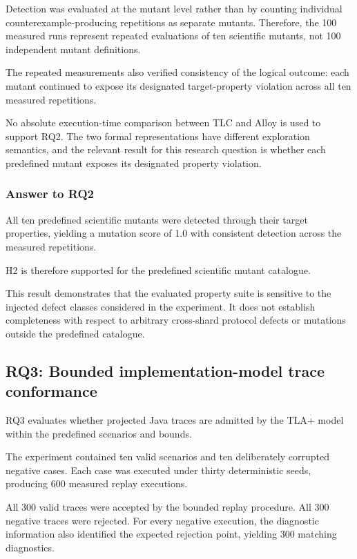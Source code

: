 Detection was evaluated at the mutant level rather than by counting
individual counterexample-producing repetitions as separate mutants.
Therefore, the 100 measured runs represent repeated evaluations of ten
scientific mutants, not 100 independent mutant definitions.

The repeated measurements also verified consistency of the logical
outcome: each mutant continued to expose its designated target-property
violation across all ten measured repetitions.

No absolute execution-time comparison between TLC and Alloy is used to
support RQ2. The two formal representations have different exploration
semantics, and the relevant result for this research question is
whether each predefined mutant exposes its designated property
violation.

\subsubsection{Answer to RQ2}
\label{subsubsec:rq2-answer}

All ten predefined scientific mutants were detected through their
target properties, yielding a mutation score of 1.0 with consistent
detection across the measured repetitions.

H2 is therefore supported for the predefined scientific mutant
catalogue.

This result demonstrates that the evaluated property suite is
sensitive to the injected defect classes considered in the experiment.
It does not establish completeness with respect to arbitrary
cross-shard protocol defects or mutations outside the predefined
catalogue.

\subsection{RQ3: Bounded implementation-model trace conformance}
\label{subsec:rq3-results}

RQ3 evaluates whether projected Java traces are admitted by the TLA+
model within the predefined scenarios and bounds.

The experiment contained ten valid scenarios and ten deliberately
corrupted negative cases. Each case was executed under thirty
deterministic seeds, producing 600 measured replay executions.

All 300 valid traces were accepted by the bounded replay procedure.
All 300 negative traces were rejected. For every negative execution,
the diagnostic information also identified the expected rejection
point, yielding 300 matching diagnostics.

